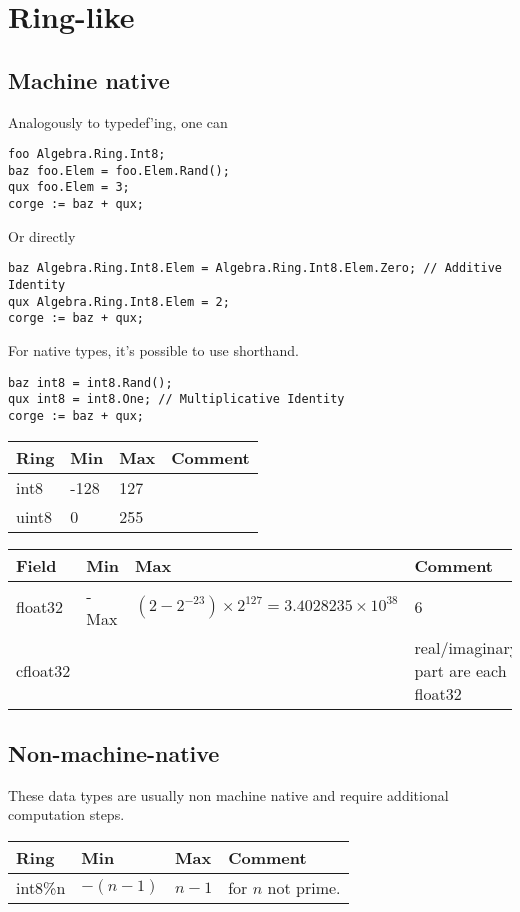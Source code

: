 \documentclass{amsbook}
\begin{document}
\section{Ring-like}

\subsection{Machine native}
Analogously to typedef'ing, one can
\begin{verbatim}
foo Algebra.Ring.Int8;
baz foo.Elem = foo.Elem.Rand();
qux foo.Elem = 3;
corge := baz + qux;
\end{verbatim}

Or directly

\begin{verbatim}
baz Algebra.Ring.Int8.Elem = Algebra.Ring.Int8.Elem.Zero; // Additive Identity
qux Algebra.Ring.Int8.Elem = 2;
corge := baz + qux;
\end{verbatim}

For native types, it's possible to use shorthand.
\begin{verbatim}
baz int8 = int8.Rand();
qux int8 = int8.One; // Multiplicative Identity
corge := baz + qux;
\end{verbatim}

\begin{tabular}{l|l|l|l}
  \textbf{Ring} & \textbf{Min} & \textbf{Max} & \textbf{Comment}\\
  \hline
  int8 &  -128 & 127 & \\
  uint8 & 0 & 255 & \\
\end{tabular}

\begin{tabular}{l|l|l|l}
  \textbf{Field} & \textbf{Min} & \textbf{Max} & \textbf{Comment}\\
  \hline
  float32 & -Max & $(2-2^{-23})\times 2^{127}=3.4028235\times 10^{38}$ & 6\\
  cfloat32 & & & real/imaginary part are each float32  
\end{tabular}


\subsection{Non-machine-native}
These data types are usually non machine native and require additional computation steps.

\begin{tabular}{l|l|l|l}
  \textbf{Ring} & \textbf{Min} & \textbf{Max} & \textbf{Comment}\\
  \hline
  int8\%n &  $-(n-1)$ & $n-1$ & for $n$ not prime. \\
\end{tabular}
\end{document}

